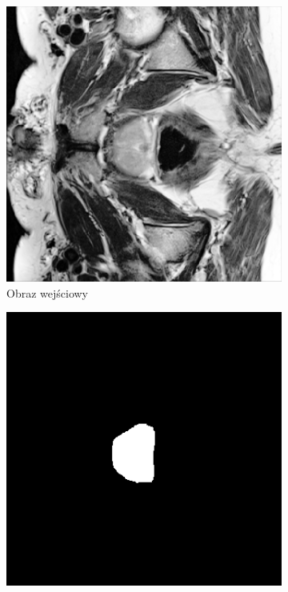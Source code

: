 \documentclass[a4paper,11pt,twoside]{report}
\theoremstyle{definition}
\begin{document}
\begin{figure}[htb]
	\centering %
	\begin{subfigure}{0.25\textwidth}
		\includegraphics[width=\linewidth,angle=270,origin=c]{segmentation/segmentation_train_1.png}
		\caption{Obraz wejściowy}
		\label{fig:1}
	\end{subfigure}\hfil %
	\begin{subfigure}{0.25\textwidth}
		\includegraphics[width=\linewidth,angle=270,origin=c]{segmentation/segmentaion_mask_1.png}

\end{subfigure}
\end{figure}
\end{document}
